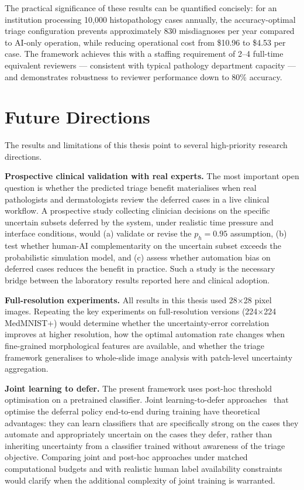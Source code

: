 The practical significance of these results can be quantified concisely: for an institution processing 10,000 histopathology cases annually, the accuracy-optimal triage configuration prevents approximately 830 misdiagnoses per year compared to AI-only operation, while reducing operational cost from \$10.96 to \$4.53 per case. The framework achieves this with a staffing requirement of 2--4 full-time equivalent reviewers --- consistent with typical pathology department capacity --- and demonstrates robustness to reviewer performance down to 80\% accuracy.

\section{Future Directions}

The results and limitations of this thesis point to several high-priority research directions.

\textbf{Prospective clinical validation with real experts.} The most important open question is whether the predicted triage benefit materialises when real pathologists and dermatologists review the deferred cases in a live clinical workflow. A prospective study collecting clinician decisions on the specific uncertain subsets deferred by the system, under realistic time pressure and interface conditions, would (a) validate or revise the $p_h = 0.95$ assumption, (b) test whether human-AI complementarity on the uncertain subset exceeds the probabilistic simulation model, and (c) assess whether automation bias on deferred cases reduces the benefit in practice. Such a study is the necessary bridge between the laboratory results reported here and clinical adoption.

\textbf{Full-resolution experiments.} All results in this thesis used 28$\times$28 pixel images. Repeating the key experiments on full-resolution versions (224$\times$224 MedMNIST+) would determine whether the uncertainty-error correlation improves at higher resolution, how the optimal automation rate changes when fine-grained morphological features are available, and whether the triage framework generalises to whole-slide image analysis with patch-level uncertainty aggregation.

\textbf{Joint learning to defer.} The present framework uses post-hoc threshold optimisation on a pretrained classifier. Joint learning-to-defer approaches~\cite{mozannar2020consistent} that optimise the deferral policy end-to-end during training have theoretical advantages: they can learn classifiers that are specifically strong on the cases they automate and appropriately uncertain on the cases they defer, rather than inheriting uncertainty from a classifier trained without awareness of the triage objective. Comparing joint and post-hoc approaches under matched computational budgets and with realistic human label availability constraints would clarify when the additional complexity of joint training is warranted.

